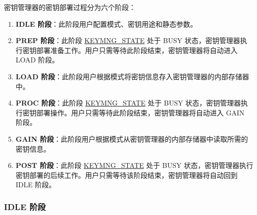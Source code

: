 \documentclass[main\_\_CN.tex]{subfiles}
\begin{document}
密钥管理器的密钥部署过程分为六个阶段：
\begin{enumerate}
    \item \textbf{IDLE 阶段}：此阶段用户配置模式、密钥用途和静态参数。
    \item \textbf{PREP 阶段}：此阶段 \hyperref[fielddesc:KEYMNGSTATE]{KEYMNG\_STATE} 处于 BUSY 状态，密钥管理器执行密钥部署准备工作。用户只需等待此阶段结束，密钥管理器将自动进入 LOAD 阶段。
    \item \textbf{LOAD 阶段}：此阶段用户根据模式将密钥信息存入密钥管理器的内部存储器中。
    \item \textbf{PROC 阶段}：此阶段 \hyperref[fielddesc:KEYMNGSTATE]{KEYMNG\_STATE} 处于 BUSY 状态，密钥管理器执行密钥部署操作。用户只需等待此阶段结束，密钥管理器将自动进入 GAIN 阶段。
    \item \textbf{GAIN 阶段}：此阶段用户根据模式从密钥管理器的内部存储器中读取所需的密钥信息。
    \item \textbf{POST 阶段}：此阶段 \hyperref[fielddesc:KEYMNGSTATE]{KEYMNG\_STATE} 处于 BUSY 状态，密钥管理器执行密钥部署的后续工作。用户只需等待该阶段结束，密钥管理器将自动回到 IDLE 阶段。
\end{enumerate}

\subsubsection{IDLE 阶段}
\end{document}

